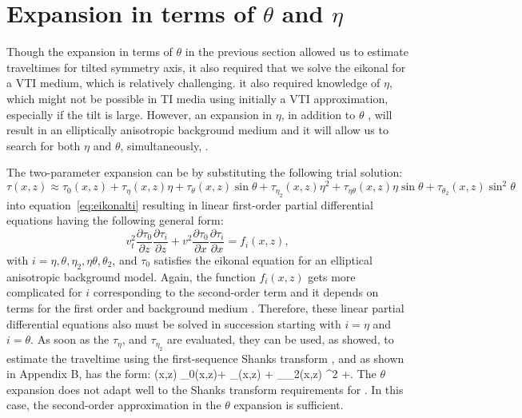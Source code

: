 \section{Expansion in terms of $\theta$ and $\eta$}

Though the expansion in terms of $\theta$ in the previous section allowed us to estimate traveltimes for   tilted symmetry axis, it also required 
that we solve the eikonal  for a VTI medium, which
is relatively challenging.  it also required knowledge of $\eta$, which might not be possible
in TI media using initially a VTI approximation, especially if the tilt is large.
 However, an expansion in $\eta$, in addition to $\theta$ , 
 will result in an elliptically anisotropic background medium  and it will allow us to search for both $\eta$ and $\theta$, simultaneously, .
 
 The two-parameter expansion can be   by substituting the following trial solution:
 \begin{equation}
 \tau(x,z) \approx \tau_{0}(x,z) +\tau_{\eta}(x,z) \eta+\tau_{\theta}(x,z) \sin\theta+ \tau_{\eta_2}(x,z)  \eta^{2}+ \tau_{\eta \theta}(x,z)  \eta \sin\theta+ \tau_{\theta_2}(x,z)  \sin^{2}\theta
\label{eqn:n0ee}
\end{equation}
into equation~\ref{eq:eikonalti} resulting in linear first-order partial differential equations having the following general form:
\begin{equation}
v_t^2 \frac{\partial \tau _{0}}{\partial z} \frac{\partial \tau _i}{\partial z}+
v^2 \frac{\partial \tau _{0}}{\partial x} \frac{\partial \tau _i}{\partial x} =
f_i(x,z),
\label{eqn:allorder}
\end{equation}
with $i=\eta,\theta,\eta_2,\eta \theta,\theta_2$, and $\tau_{0}$ satisfies the eikonal equation for an
 elliptical anisotropic background model. Again, the function
 $f_i(x,z)$ gets more complicated for $i$ corresponding to the
 second-order term and it depends on terms for the first order and
 background medium . 
Therefore, these linear partial differential equations also must be solved in succession 
starting with $i=\eta$ and $i=\theta$. As soon as
the $\tau_{\eta}$,  and $\tau_{\eta_2}$   are evaluated, they can be used, as  \cite{etascan} showed,
 to estimate the traveltime using the first-sequence  Shanks transform \cite[]{Bender},
and as shown in Appendix B, has the form:
\beq
\tau(x,z) \approx \tau_{0}(x,z)+ \tau_{\theta}(x,z) \sin\theta+ \tau_{\theta_2}(x,z)  \sin^{2}\theta
+.
\label{eqn:shanks1m1}
\eeq
The $\theta$ expansion does not adapt well to the Shanks transform
requirements for  .
In this case, the second-order approximation in the $\theta$ expansion
is sufficient.


